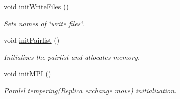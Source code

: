 \begin{DoxyCompactItemize}
void \hyperlink{class_inicializer_aa83bb88c8dae21837f025912b2fff68b}{init\+Write\+Files} ()
\begin{DoxyCompactList}\small\item\em Sets names of \char`\"{}write files\char`\"{}. \end{DoxyCompactList}\item 
void \hyperlink{class_inicializer_adbd22bfd9d376b88ab4e1252e752f64b}{init\+Pairlist} ()
\begin{DoxyCompactList}\small\item\em Initializes the pairlist and allocates memory. \end{DoxyCompactList}\item 
void \hyperlink{class_inicializer_afb8f1f23bd87796ae7e66a3917cd1980}{init\+M\+P\+I} ()
\begin{DoxyCompactList}\small\item\em Paralel tempering(\+Replica exchange move) initialization. \end{DoxyCompactList}\end{DoxyCompactItemize}
